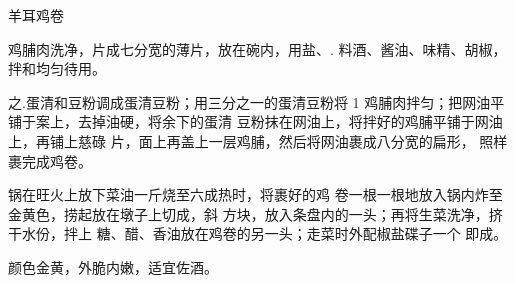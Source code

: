 \begin{recipe}{羊耳鸡卷}

\ingredients


\cooking

\step 鸡脯肉洗净，片成七分宽的薄片，放在碗内，用盐、. 料酒、酱油、味精、胡椒，拌和均匀待用。

之.蛋清和豆粉调成蛋清豆粉；用三分之一的蛋清豆粉将 1 鸡脯肉拌匀；把网油平铺于案上，去掉油硬，将余下的蛋清 豆粉抹在网油上，将拌好的鸡脯平铺于网油上，再铺上慈碌 片，面上再盖上一层鸡脯，然后将网油裹成八分宽的扁形， 照样裹完成鸡卷。

\step 锅在旺火上放下菜油一斤烧至六成热时，将裹好的鸡 卷一根一根地放入锅内炸至金黄色，捞起放在墩子上切成，斜 方块，放入条盘内的一头；再将生菜洗净，挤干水份，拌上 糖、醋、香油放在鸡卷的另一头；走菜时外配椒盐碟子一个 即成。

\notes

颜色金黄，外脆内嫩，适宜佐酒。

\end{recipe}

